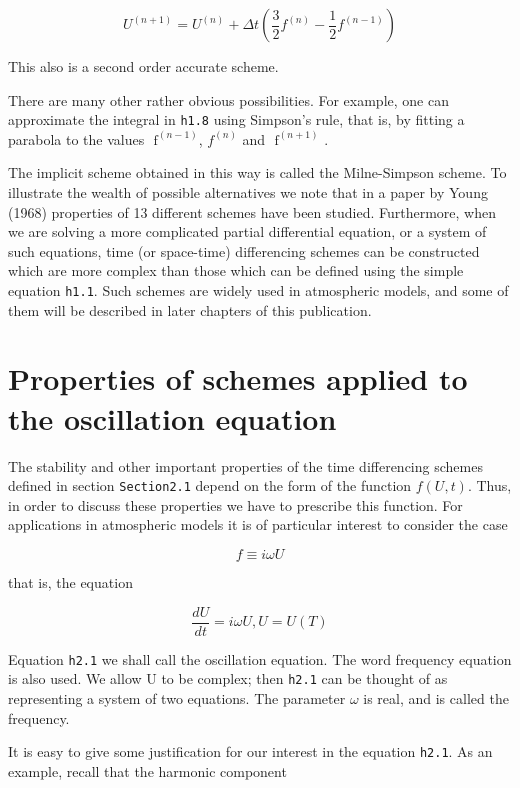\[U^{\left( n + 1 \right)} = U^{\left( n \right)} + \Delta t\left( \frac{3}{2}f^{\left( n \right)} - \frac{1}{2}f^{\left( n - 1 \right)} \right)\]

This also is a second order accurate scheme.

There are many other rather obvious possibilities. For example, one can
approximate the integral in \texttt{h1.8} using
Simpson's rule, that is, by fitting a parabola to the
values \(\text{ f}^{\left( n - 1 \right)}\), \(f^{\left( n \right)}\)
and \(\text{ f}^{\left( n + 1 \right)}\) .

The implicit scheme obtained in this way is called the Milne-Simpson
scheme. To illustrate the wealth of possible alternatives we note that
in a paper by Young (1968) properties of 13 different schemes have been
studied. Furthermore, when we are solving a more complicated partial
differential equation, or a system of such equations, time (or
space-time) differencing schemes can be constructed which are more
complex than those which can be defined using the simple equation
\texttt{h1.1}. Such schemes are widely used in atmospheric models, and
some of them will be described in later chapters of this publication.

\section{Properties of schemes applied to the oscillation equation}
\label{sec:properties-of-schemes-applied-to-the-oscillation-equation}

The stability and other important properties of the time differencing
schemes defined in section \texttt{Section2.1} depend on the form of the
function \(f\left( U,t \right)\). Thus, in order to discuss these
properties we have to prescribe this function. For applications in
atmospheric models it is of particular interest to consider the case

\[f \equiv i\omega U\]

that is, the equation

\[\frac{dU}{dt} = i\omega U, U = U\left( T \right)\]

Equation \texttt{h2.1} we shall call the oscillation equation. The word
frequency equation is also used. We allow U to be complex; then
\texttt{h2.1} can be thought of as representing a system of two
equations. The parameter \(\omega\) is real, and is called the
frequency.

It is easy to give some justification for our interest in the equation
\texttt{h2.1}. As an example, recall that the harmonic component

